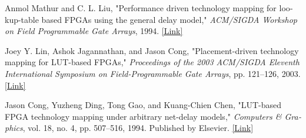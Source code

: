 \begin{latin}
	\begin{thebibliography}{9}
		Anmol Mathur and C. L. Liu, "Performance driven technology mapping for lookup-table based FPGAs using the general delay model," \textit{ACM/SIGDA Workshop on Field Programmable Gate Arrays}, 1994.
		\href{https://websrv.cecs.uci.edu/~papers/compendium94-03/papers/1994/fpga94/pdffiles/fpga94_3_1.pdf}{[Link]}
		
		
		
		Joey Y. Lin, Ashok Jagannathan, and Jason Cong, "Placement-driven technology mapping for LUT-based FPGAs," \textit{Proceedings of the 2003 ACM/SIGDA Eleventh International Symposium on Field-Programmable Gate Arrays}, pp. 121--126, 2003.
		\href{http://courses.ece.ubc.ca/583/papers/44.pdf}{[Link]}
		
		
		Jason Cong, Yuzheng Ding, Tong Gao, and Kuang-Chien Chen, "LUT-based FPGA technology mapping under arbitrary net-delay models," \textit{Computers \& Graphics}, vol. 18, no. 4, pp. 507--516, 1994. Published by Elsevier.
		\href{https://citeseerx.ist.psu.edu/document?repid=rep1&type=pdf&doi=9c76e1834bf43160d6a090ead16fede3c3214ee7}{[Link]}
		
		
		
		
		
		

		
		
		
		

	\end{thebibliography} 
\end{latin}
